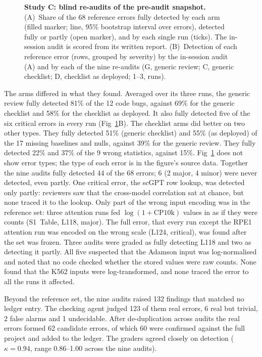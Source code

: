 \documentclass[10pt,letterpaper]{article}
\begin{document}
\begin{figure}[H]
\caption{\textbf{Study C: blind re-audits of the pre-audit snapshot.}
(A)~Share of the 68 reference errors fully detected by each arm (filled
marker; line, 95\% bootstrap interval over errors), detected fully or
partly (open marker), and by each single run (ticks). The in-session
audit is scored from its written report. (B)~Detection of each reference
error (rows, grouped by severity) by the in-session audit (A) and by each
of the nine re-audits (G, generic review; C, generic checklist; D,
checklist as deployed; 1--3, runs).}
\label{fig:studyC}
\end{figure}

The arms differed in what they found. Averaged over its three runs, the
generic review fully detected 81\% of the 12 code bugs, against 69\% for
the generic checklist and 58\% for the checklist as deployed. It also
fully detected five of the six critical errors in every run
(Fig~\ref{fig:studyC}B). The checklist arms did better on two other
types. They fully detected 51\% (generic checklist) and 55\% (as
deployed) of the 17 missing baselines and nulls, against 39\% for the
generic review. They fully detected 22\% and 37\% of the 9 wrong
statistics, against 15\%. Fig~\ref{fig:studyC} does not show error
types; the type of each error is in the figure's source data. Together
the nine audits fully
detected 44 of the 68 errors; 6 (2 major, 4 minor) were never detected,
even partly. One critical error, the scGPT row lookup, was detected only
partly: reviewers saw that the cross-model correlation sat at chance, but
none traced it to the lookup. Only part of the wrong input encoding was
in the reference set: three attention runs fed $\log(1+\text{CP10k})$
values in as if they were counts (S1~Table, L118, major). The full error,
that every run except the RPE1 attention run was encoded on the wrong
scale (L124, critical), was found after the set was frozen. Three audits
were graded as fully detecting L118 and two as detecting it partly. All
five suspected that the Adamson input was log-normalised and noted that
no code checked whether the stored values were raw counts. None found
that the K562 inputs were log-transformed, and none traced the error to
all the runs it affected.

Beyond the reference set, the nine audits raised 132 findings that
matched no ledger entry. The checking agent judged 123 of them real
errors, 6 real but trivial, 2 false alarms and 1 undecidable. After
de-duplication across audits the real errors formed 62 candidate errors,
of which 60 were confirmed against the full project and added to the
ledger. The graders
agreed closely on detection ($\kappa = 0.94$, range 0.86--1.00 across the
nine audits).
\end{document}
